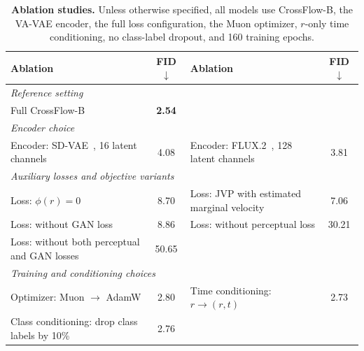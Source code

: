 \begin{table}[!ht]
\centering
\caption{\textbf{Ablation studies.} Unless otherwise specified, all models use CrossFlow-B, the VA-VAE encoder, the full loss configuration, the Muon optimizer, $r$-only time conditioning, no class-label dropout, and 160 training epochs.}
\vspace{0.5em}
\small
\setlength{\tabcolsep}{3pt}
\begin{tabular}{l c l c}
\toprule
\textbf{Ablation} & \textbf{FID $\downarrow$} & \textbf{Ablation} & \textbf{FID $\downarrow$}\\
\midrule
\multicolumn{2}{l}{\textit{Reference setting}} \\
Full CrossFlow-B & \textbf{2.54} \\
\midrule
\multicolumn{2}{l}{\textit{Encoder choice}} \\
Encoder: SD-VAE~\citep{ldm}, 16 latent channels & 4.08 &
Encoder: FLUX.2~\citep{flux2}, 128 latent channels & 3.81 \\
\midrule
\multicolumn{2}{l}{\textit{Auxiliary losses and objective variants}} \\
Loss: $\phi(r) = 0$ & 8.70 &
Loss: JVP with estimated marginal velocity & 7.06\\
Loss: without GAN loss & 8.86 &
Loss: without perceptual loss & 30.21 \\
Loss: without both perceptual and GAN losses & 50.65 \\
\midrule
\multicolumn{2}{l}{\textit{Training and conditioning choices}} \\
Optimizer: Muon $\rightarrow$ AdamW & 2.80 &
Time conditioning: $r\rightarrow(r,t)$ & 2.73 \\
Class conditioning: drop class labels by 10\% & 2.76 \\
\bottomrule
\end{tabular}
\label{tab:ablation}
\end{table}
